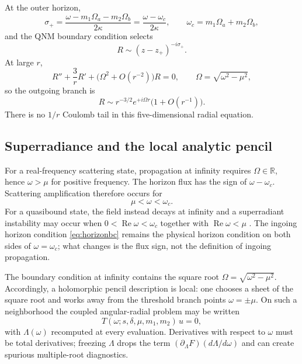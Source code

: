 \documentclass[10pt]{article}
\theoremstyle{plain}
\newcommand{\Rey}{\operatorname{Re}}
\begin{document}
At the outer horizon,
\begin{equation}
\sigma_+=\frac{\omega-m_1\Omega_a-m_2\Omega_b}{2\kappa}=\frac{\omega-\omega_c}{2\kappa},
\qquad \omega_c=m_1\Omega_a+m_2\Omega_b,
\end{equation}
and the QNM boundary condition selects
\begin{equation}
R\sim(z-z_+)^{-i\sigma_+}.
\label{eq:horizonbc}
\end{equation}
At large $r$,
\begin{equation}
R''+\frac{3}{r}R'+\bigl(\Omega^2+O(r^{-2})\bigr)R=0,\qquad
\Omega=\sqrt{\omega^2-\mu^2},
\end{equation}
so the outgoing branch is
\begin{equation}
R\sim r^{-3/2}e^{+i\Omega r}\bigl(1+O(r^{-1})\bigr).
\label{eq:infinitybc}
\end{equation}
There is no $1/r$ Coulomb tail in this five-dimensional radial equation.

\subsection{Superradiance and the local analytic pencil}

For a real-frequency scattering state, propagation at infinity requires
$\Omega\in\mathbb{R}$, hence $\omega>\mu$ for positive frequency. The horizon
flux has the sign of $\omega-\omega_c$. Scattering amplification therefore
occurs for
\begin{equation}
\mu<\omega<\omega_c.
\end{equation}
For a quasibound state, the field instead decays at infinity and a superradiant
instability may occur when $0<\Rey\omega<\omega_c$ together with
$\Rey\omega<\mu$ \citep{detweiler1980,dolan2007}. The ingoing horizon condition
\eqref{eq:horizonbc} remains the physical horizon condition on both sides of
$\omega=\omega_c$; what changes is the flux sign, not the definition of ingoing
propagation.

The boundary condition at infinity contains the square root
$\Omega=\sqrt{\omega^2-\mu^2}$. Accordingly, a holomorphic pencil description is
local: one chooses a sheet of the square root and works away from the threshold
branch points $\omega=\pm\mu$. On such a neighborhood the coupled
angular-radial problem may be written
\begin{equation}
T(\omega;s,\delta,\mu,m_1,m_2)\,u=0,
\end{equation}
with $\Lambda(\omega)$ recomputed at every evaluation. Derivatives with respect
to $\omega$ must be total derivatives; freezing $\Lambda$ drops the term
$(\partial_\Lambda F)(d\Lambda/d\omega)$ and can create spurious multiple-root
diagnostics.
\end{document}
